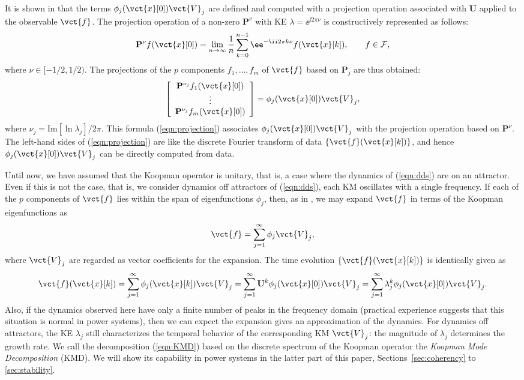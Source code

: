 \documentclass[a4paper,10pt]{article}
\def\bU{{\mathbf{U}}}
\def\bP{{\mathbf{P}}}
\def\cF{{\mathcal{F}}}
\begin{document}
%
It is shown in \cite{Mezic_PD197,Mezic_ND41} that the terms $\phi_j(\vct{x}[0])\vct{V}_j$ are defined and computed with a projection operation associated with $\bU$ applied to the observable $\vct{f}$.  
The projection operation of a non-zero $\bP^\nu$ with KE $\lambda=\ee^{\ii 2\pi\nu}$ is constructively represented as follows: 
\[
\bP^\nu f(\vct{x}[0])
=\lim_{n\rightarrow\infty}\frac{1}{n}\sum^{n-1}_{k=0}\ee^{-\ii2\pi k\nu}f(\vct{x}[k]),\makebox[2em]{}
f\in\cF,
\]
where $\nu\in[-1/2,1/2)$.  
The projections of the $p$ components $f_1,\ldots,f_m$ of $\vct{f}$ based on $\bP_j$ are thus obtained:
\begin{equation}
\left[
\begin{array}{c}
\bP^{\nu_j}f_1(\vct{x}[0])\\
\vdots\\
\bP^{\nu_j}f_m(\vct{x}[0])
\end{array}
\right]
=\phi_j(\vct{x}[0])\vct{V}_{j},
\label{eqn:projection}
\end{equation}
where $\nu_j=\mathrm{Im}[\ln\lambda_j]/2\pi$.   
This formula (\ref{eqn:projection}) associates $\phi_j(\vct{x}[0])\vct{V}_j$ with the projection operation based on $\bP^\nu$.   
The left-hand sides of (\ref{eqn:projection}) are like the discrete Fourier transform of data $\{\vct{f}(\vct{x}[k])\}$, and hence $\phi_j(\vct{x}[0])\vct{V}_j$ can be directly computed from data.  

%
Until now, we have assumed that the Koopman operator is unitary, that is, a case where the dynamics of (\ref{eqn:dds}) are on an attractor.  
Even if this is not the case, that is, we consider dynamics off attractors of (\ref{eqn:dds}), each KM oscillates with a single frequency.   
If each of the $p$ components of $\vct{f}$ lies within the span of eigenfunctions $\phi_j$, then, as in \cite{Rowley_JFM641}, we may expand $\vct{f}$ in terms of the Koopman eigenfunctions as
\[
\vct{f}=\sum_{j=1}^{\infty}\phi_j\vct{V}_j, 
\]
where $\vct{V}_j$ are regarded as vector coefficients for the expansion.  
The time evolution $\{\vct{f}(\vct{x}[k])\}$ is identically given as
\begin{equation}
\vct{f}(\vct{x}[k])
=\sum^\infty_{j=1}\phi_j(\vct{x}[k])\vct{V}_j
=\sum^\infty_{j=1}{\bU}^k\phi_j(\vct{x}[0])\vct{V}_j
=\sum^\infty_{j=1}\lambda^k_j\phi_j(\vct{x}[0])\vct{V}_j.
\label{eqn:KMD}
\end{equation}
Also, if the dynamics observed here have only a finite number of peaks in the frequency domain (practical experience suggests that this situation is normal in power systems), then we can expect the expansion gives an approximation of the dynamics.  
For dynamics off attractors, the KE $\lambda_j$ still characterizes the temporal behavior of the corresponding KM $\vct{V}_j$:  
the magnitude of $\lambda_j$ determines the growth rate.  
We call the decomposition (\ref{eqn:KMD}) based on the discrete spectrum of the Koopman operator the \emph{Koopman Mode Decomposition} (KMD).
We will show its capability in power systems in the latter part of this paper, Sections~\ref{sec:coherency} to \ref{sec:stability}.  
\end{document}
